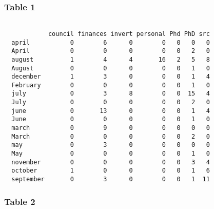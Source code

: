 \hypertarget{table-1}{%
\subsubsection{Table 1}\label{table-1}}
\begin{Shaded}
\begin{Highlighting}[]
\SpecialCharTok{$}\SpecialCharTok{$}
\end{Highlighting}
\end{Shaded}
\begin{verbatim}
           
            council finances invert personal Phd PhD src
  april           0        6      0        0   0   0   0
  April           0        0      0        0   0   2   0
  august          1        4      4       16   2   5   8
  August          0        0      0        0   0   1   0
  december        1        3      0        0   0   1   4
  February        0        0      0        0   0   1   0
  july            0        3      8        0   0  15   4
  July            0        0      0        0   0   2   0
  june            0       13      0        0   0   1   4
  June            0        0      0        0   0   1   0
  march           0        9      0        0   0   0   0
  March           0        0      0        0   0   2   0
  may             0        3      0        0   0   0   0
  May             0        0      0        0   0   1   0
  november        0        0      0        0   0   3   4
  october         1        0      0        0   0   1   6
  september       0        3      0        0   0   1  11
\end{verbatim}
\hypertarget{table-2}{%
\subsubsection{Table 2}\label{table-2}}
\begin{Shaded}
\begin{Highlighting}[]
\SpecialCharTok{$}\SpecialCharTok{$}\SpecialCharTok{$}
\end{Highlighting}
\end{Shaded}
